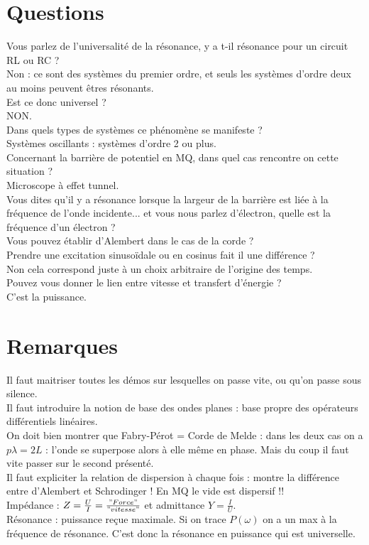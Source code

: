 \documentclass[12pt,prb,aps,epsf]{article}
\begin{document}
\section*{Questions}
Vous parlez de l'universalité de la résonance, y a t-il résonance pour un circuit RL ou RC ?\\
Non : ce sont des systèmes du premier ordre, et seuls les systèmes d'ordre deux au moins peuvent êtres résonants.\\

Est ce donc universel ?\\
NON.\\

Dans quels types de systèmes ce phénomène se manifeste ?\\
Systèmes oscillants : systèmes d'ordre 2 ou plus.\\

Concernant la barrière de potentiel en MQ, dans quel cas rencontre on cette situation ?\\
Microscope à effet tunnel.\\

Vous dites qu'il y a résonance lorsque la largeur de la barrière est liée à la fréquence de l'onde incidente... et vous nous parlez d'électron, quelle est la fréquence d'un électron ?\\

Vous pouvez établir d'Alembert dans le cas de la corde ?\\

Prendre une excitation sinusoïdale ou en cosinus fait il une différence ?\\
Non cela correspond juste à un choix arbitraire de l'origine des temps.\\

Pouvez vous donner le lien entre vitesse et transfert d'énergie ?\\
C'est la puissance.

\section*{Remarques}
Il faut maitriser toutes les démos sur lesquelles on passe vite, ou qu'on passe sous silence.\\
Il faut introduire la notion de base des ondes planes : base propre des opérateurs différentiels linéaires.\\
On doit bien montrer que Fabry-Pérot = Corde de Melde : dans les deux cas on a $p\lambda = 2L$ : l'onde se superpose alors à elle même en phase. Mais du coup il faut vite passer sur le second présenté.\\
Il faut expliciter la relation de dispersion à chaque fois : montre la différence entre d'Alembert et Schrodinger ! En MQ le vide est dispersif !!\\
Impédance : $Z = \frac{U}{I} = \frac{"Force"}{"vitesse"}$ et admittance $Y = \frac{I}{U}$.\\
Résonance : puissance reçue maximale. Si on trace $P(\omega)$ on a un max à la fréquence de résonance. C'est donc la résonance en puissance qui est universelle.\\
\end{document}
